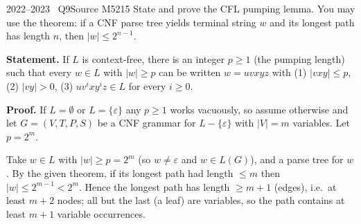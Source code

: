 \documentclass[11pt,a4paper]{article}
\newcommand{\eps}{\varepsilon}
\begin{document}
\begin{question}{2022--2023 \textbullet\ Q9}{Source M52}{15}
State and prove the CFL pumping lemma. You may use the theorem: if a CNF parse tree yields terminal string $w$ and its longest path has length $n$, then $|w|\le2^{n-1}$.
\end{question}
\begin{solution}
\textbf{Statement.} If $L$ is context-free, there is an integer $p\ge1$ (the pumping length) such that every $w\in L$ with $|w|\ge p$ can be written $w=uvxyz$ with (1) $|vxy|\le p$, (2) $|vy|>0$, (3) $uv^ixy^iz\in L$ for every $i\ge0$.

\textbf{Proof.} If $L=\emptyset$ or $L=\{\eps\}$ any $p\ge1$ works vacuously, so assume otherwise and let $G=(V,T,P,S)$ be a CNF grammar for $L-\{\eps\}$ with $|V|=m$ variables. Let $p=2^m$.

Take $w\in L$ with $|w|\ge p=2^m$ (so $w\ne\eps$ and $w\in L(G)$), and a parse tree for $w$. By the given theorem, if its longest path had length $\le m$ then $|w|\le2^{m-1}<2^m$. Hence the longest path has length $\ge m+1$ (edges), i.e.\ at least $m+2$ nodes; all but the last (a leaf) are variables, so the path contains at least $m+1$ variable occurrences.


\end{solution}
\end{document}
